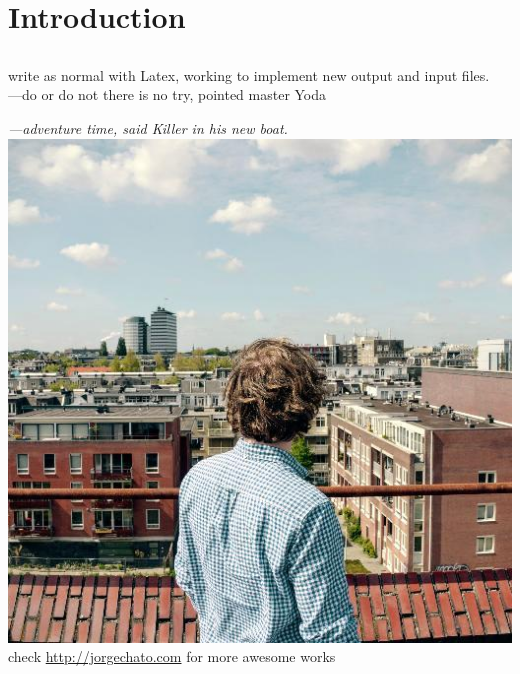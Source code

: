 \chapter{Introduction}
\section{}
write as normal with Latex, working to implement new output and input files.\\
---do or do not there is no try, pointed master Yoda\par
\textit{---adventure time, said Killer in his new boat.}\\
\includegraphics{./images/0.jpg}\\
check \url{http://jorgechato.com} for more awesome works
